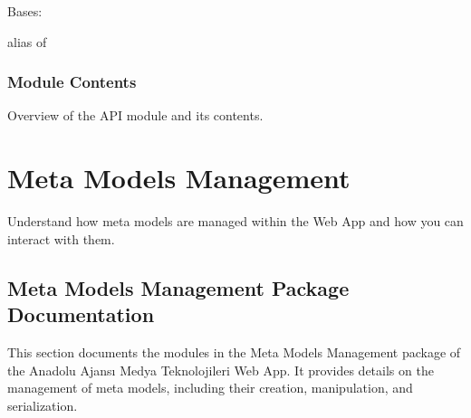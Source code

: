 \documentclass[letterpaper,10pt,english]{sphinxmanual}
\begin{document}

\begin{fulllineitems}
\label{\detokenize{source/api:api.views.VoiceUploadViewSet}}
\pysigstartsignatures
{}
\pysigstopsignatures
\sphinxAtStartPar
Bases: 

\begin{fulllineitems}
\label{\detokenize{source/api:api.views.VoiceUploadViewSet.serializer_class}}
\pysigstartsignatures
{}
\pysigstopsignatures
\sphinxAtStartPar
alias of {\hyperref[\detokenize{source/api:api.serializers.VoiceUploadSerializer}]{}}

\end{fulllineitems}


\end{fulllineitems}



\subsection{Module Contents}
\label{\detokenize{source/api:module-contents}}
\sphinxAtStartPar
Overview of the API module and its contents.
\label{\detokenize{source/api:module-api}}

\chapter{Meta Models Management}
\label{\detokenize{index:meta-models-management}}
\sphinxAtStartPar
Understand how meta models are managed within the Web App and how you can interact with them.

\sphinxstepscope


\section{Meta Models Management Package Documentation}
\label{\detokenize{source/meta_models_management:meta-models-management-package-documentation}}\label{\detokenize{source/meta_models_management::doc}}
\sphinxAtStartPar
This section documents the modules in the Meta Models Management package of the Anadolu Ajansı Medya Teknolojileri Web App. It provides details on the management of meta models, including their creation, manipulation, and serialization.
\end{document}
